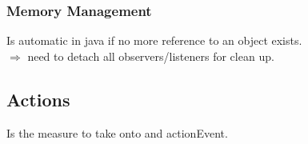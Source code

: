 \subsubsection{Memory Management}
\label{subsubsec:MemoryManagement}
\begin{sectionbox}\nospacing
  Is automatic in java if no more reference to an object exists.\\
  $\Rightarrow$ need to detach all observers/listeners for clean up.
\end{sectionbox}
\subsection{Actions}
\begin{defnbox}\nospacing
  \begin{defn}[Action]\label{defn:Action}
    Is the measure to take onto and actionEvent.
  \end{defn}
\end{defnbox}

